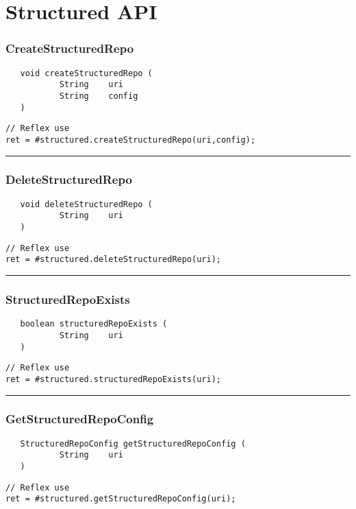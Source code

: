 \section{Structured API}

\subsubsection{CreateStructuredRepo}
\label{Api:CreateStructuredRepo}
\begin{verbatim}
   void createStructuredRepo (
           String    uri
           String    config
   )
\end{verbatim}
\begin{lstlisting}[language=reflex]
// Reflex use
ret = #structured.createStructuredRepo(uri,config);
\end{lstlisting}



\rule{15cm}{2pt}
\subsubsection{DeleteStructuredRepo}
\label{Api:DeleteStructuredRepo}
\begin{verbatim}
   void deleteStructuredRepo (
           String    uri
   )
\end{verbatim}
\begin{lstlisting}[language=reflex]
// Reflex use
ret = #structured.deleteStructuredRepo(uri);
\end{lstlisting}



\rule{15cm}{2pt}
\subsubsection{StructuredRepoExists}
\label{Api:StructuredRepoExists}
\begin{verbatim}
   boolean structuredRepoExists (
           String    uri
   )
\end{verbatim}
\begin{lstlisting}[language=reflex]
// Reflex use
ret = #structured.structuredRepoExists(uri);
\end{lstlisting}



\rule{15cm}{2pt}
\subsubsection{GetStructuredRepoConfig}
\label{Api:GetStructuredRepoConfig}
\begin{verbatim}
   StructuredRepoConfig getStructuredRepoConfig (
           String    uri
   )
\end{verbatim}
\begin{lstlisting}[language=reflex]
// Reflex use
ret = #structured.getStructuredRepoConfig(uri);
\end{lstlisting}



